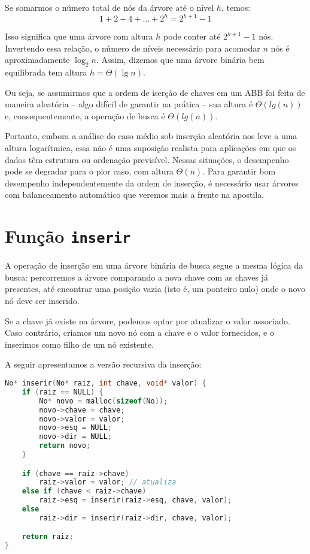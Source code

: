 Se somarmos o número total de nós da árvore até o nível $h$, temos:
\[
1 + 2 + 4 + \dots + 2^h = 2^{h+1} - 1
\]

Isso significa que uma árvore com altura $h$ pode conter até $2^{h+1} - 1$ nós. 
Invertendo essa relação, o número de níveis necessário para acomodar $n$ nós é aproximadamente $\log_2 n$. 
Assim, dizemos que uma árvore binária bem equilibrada tem altura $h = \Theta(\lg n)$.

Ou seja, se assumirmos que a ordem de iserção de chaves em um ABB foi feita de maneira aleatória -- algo difícil de garantir na prática -- sua altura é $\Theta(lg(n))$ e, consequentemente, a operação de busca é $\Theta(lg(n))$.

Portanto, embora a análise do caso médio sob inserção aleatória nos leve a uma altura logarítmica, essa não é uma suposição realista para aplicações em que os dados têm estrutura ou ordenação previsível. 
Nessas situações, o desempenho pode se degradar para o pior caso, com altura $\Theta(n)$. 
Para garantir bom desempenho independentemente da ordem de inserção, é necessário usar árvores com balanceamento automático que veremos mais a frente na apostila.


\section{Função \texttt{inserir}}

A operação de inserção em uma árvore binária de busca segue a mesma lógica da busca: percorremos a árvore comparando a nova chave com as chaves já presentes, até encontrar uma posição vazia (isto é, um ponteiro nulo) onde o novo nó deve ser inserido.

Se a chave já existe na árvore, podemos optar por atualizar o valor associado. 
Caso contrário, criamos um novo nó com a chave e o valor fornecidos, e o inserimos como filho de um nó existente.

A seguir apresentamos a versão recursiva da inserção:

\begin{lstlisting}[language=C, caption={Inserção recursiva em ABB}]
No* inserir(No* raiz, int chave, void* valor) {
    if (raiz == NULL) {
        No* novo = malloc(sizeof(No));
        novo->chave = chave;
        novo->valor = valor;
        novo->esq = NULL;
        novo->dir = NULL;
        return novo;
    }

    if (chave == raiz->chave)
        raiz->valor = valor; // atualiza
    else if (chave < raiz->chave)
        raiz->esq = inserir(raiz->esq, chave, valor);
    else
        raiz->dir = inserir(raiz->dir, chave, valor);

    return raiz;
}
\end{lstlisting}

